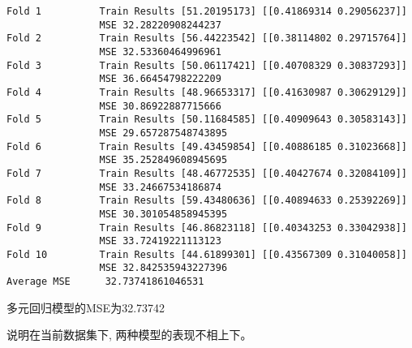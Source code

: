 \documentclass[11pt]{article}
\begin{document}
    \begin{Verbatim}[commandchars=\\\{\}]
Fold 1          Train Results [51.20195173] [[0.41869314 0.29056237]]
                MSE 32.28220908244237
Fold 2          Train Results [56.44223542] [[0.38114802 0.29715764]]
                MSE 32.53360464996961
Fold 3          Train Results [50.06117421] [[0.40708329 0.30837293]]
                MSE 36.66454798222209
Fold 4          Train Results [48.96653317] [[0.41630987 0.30629129]]
                MSE 30.86922887715666
Fold 5          Train Results [50.11684585] [[0.40909643 0.30583143]]
                MSE 29.657287548743895
Fold 6          Train Results [49.43459854] [[0.40886185 0.31023668]]
                MSE 35.252849608945695
Fold 7          Train Results [48.46772535] [[0.40427674 0.32084109]]
                MSE 33.24667534186874
Fold 8          Train Results [59.43480636] [[0.40894633 0.25392269]]
                MSE 30.301054858945395
Fold 9          Train Results [46.86823118] [[0.40343253 0.33042938]]
                MSE 33.72419221113123
Fold 10         Train Results [44.61899301] [[0.43567309 0.31040058]]
                MSE 32.842535943227396
Average MSE      32.73741861046531
    \end{Verbatim}

    多元回归模型的MSE为32.73742

说明在当前数据集下, 两种模型的表现不相上下。


    
    
    
\end{document}
